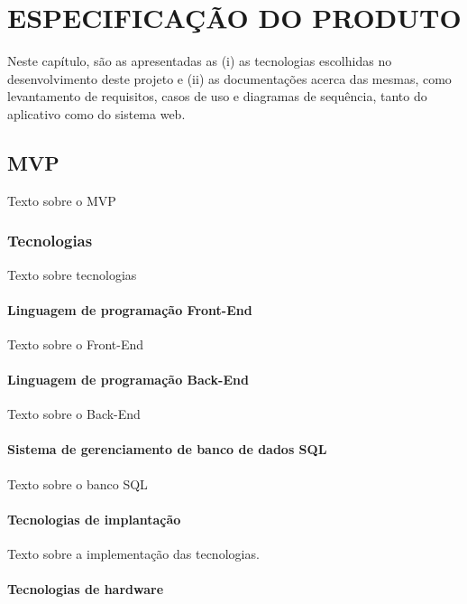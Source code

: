 \chapter{ESPECIFICAÇÃO DO PRODUTO}
\label{cap:espProd}
Neste capítulo, são as apresentadas as (i) as tecnologias escolhidas no desenvolvimento deste projeto e (ii) as documentações acerca das mesmas, como levantamento de requisitos, casos de uso e diagramas de sequência, tanto do aplicativo como do sistema web.

\section{MVP}

Texto sobre o MVP

\subsection{Tecnologias}

Texto sobre tecnologias

\subsubsection{Linguagem de programação Front-End}

Texto sobre o Front-End

\subsubsection{Linguagem de programação Back-End}

Texto sobre o Back-End

\subsubsection{Sistema de gerenciamento de banco de dados SQL}

Texto sobre o banco SQL

\subsubsection{Tecnologias de implantação}

Texto sobre a implementação das tecnologias.

\subsubsection{Tecnologias de hardware}

